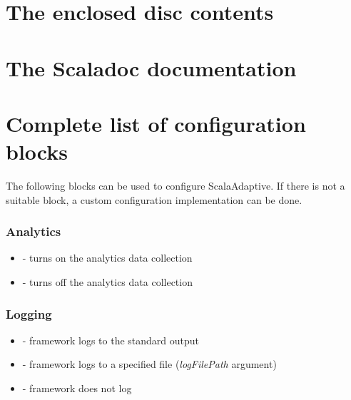 \documentclass[12pt,a4paper]{report}
\begin{document}
\label{attachments}
\renewcommand{\thesection}{\Alph{section}}

\section{The enclosed disc contents}
\label{attach:cd}

\section{The Scaladoc documentation}
\label{attach:scaladoc}

\section{Complete list of configuration blocks}
\label{attach:config_blocks}

The following blocks can be used to configure ScalaAdaptive. If there is not a suitable block, a custom configuration implementation can be done.

\subsubsection{Analytics}
\begin{itemize}
	\item {} - turns on the analytics data collection
	\item {} - turns off the analytics data collection
\end{itemize}

\subsubsection{Logging}
\begin{itemize}
	\item {} - framework logs to the standard output
	\item {} - framework logs to a specified file (\textit{logFilePath} argument)
	\item {} - framework does not log
\end{itemize}
\end{document}
